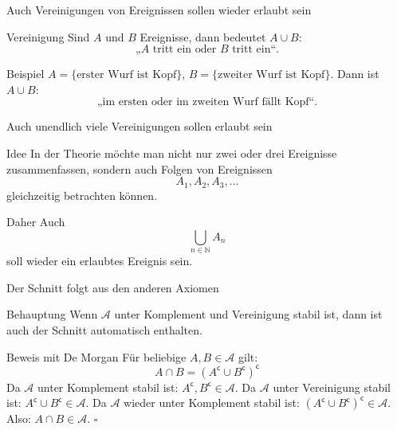 \documentclass{beamer}
\begin{document}
\begin{frame}{Auch Vereinigungen von Ereignissen sollen wieder erlaubt sein}
\begin{block}{Vereinigung}
Sind \(A\) und \(B\) Ereignisse, dann bedeutet \(A\cup B\):
\[
\text{„\(A\) tritt ein oder \(B\) tritt ein“.}
\]
\end{block}

\begin{block}{Beispiel}
\(A=\{\text{erster Wurf ist Kopf}\}\),
\(B=\{\text{zweiter Wurf ist Kopf}\}\). Dann ist \(A\cup B\):
\[
\text{„im ersten oder im zweiten Wurf fällt Kopf“.}
\]
\end{block}
\end{frame}

\begin{frame}{Auch unendlich viele Vereinigungen sollen erlaubt sein}
\begin{block}{Idee}
In der Theorie möchte man nicht nur zwei oder drei Ereignisse zusammenfassen,
sondern auch Folgen von Ereignissen
\[
A_1,A_2,A_3,\dots
\]
gleichzeitig betrachten können.
\end{block}

\begin{block}{Daher}
Auch
\[
\bigcup_{n\in\mathbb N} A_n
\]
soll wieder ein erlaubtes Ereignis sein.
\end{block}
\end{frame}

\begin{frame}{Der Schnitt folgt aus den anderen Axiomen}
\begin{block}{Behauptung}
Wenn \(\mathcal A\) unter Komplement und Vereinigung stabil ist, dann ist auch der Schnitt automatisch enthalten.
\end{block}

\begin{block}{Beweis mit De Morgan}
Für beliebige \(A, B \in \mathcal A\) gilt:
\[
A \cap B = (A^{\mathsf c} \cup B^{\mathsf c})^{\mathsf c}
\]
Da \(\mathcal A\) unter Komplement stabil ist: \(A^{\mathsf c}, B^{\mathsf c} \in \mathcal A\).
Da \(\mathcal A\) unter Vereinigung stabil ist: \(A^{\mathsf c} \cup B^{\mathsf c} \in \mathcal A\).
Da \(\mathcal A\) wieder unter Komplement stabil ist: \((A^{\mathsf c} \cup B^{\mathsf c})^{\mathsf c} \in \mathcal A\).
Also: \(A \cap B \in \mathcal A\). \(\square\)
\end{block}
\end{frame}
\end{document}
